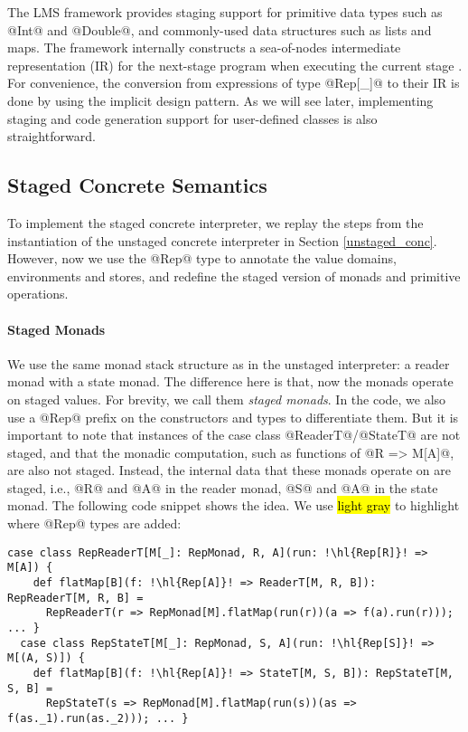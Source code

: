 The LMS framework provides staging support for primitive data types such as
@Int@ and @Double@, and commonly-used data structures such as lists and maps.
The framework internally constructs a sea-of-nodes intermediate representation (IR)
for the next-stage program when executing the current stage \cite{DBLP:conf/birthday/Rompf16}.
For convenience, the conversion from expressions of type @Rep[_]@ to their IR
is done by using the implicit design pattern. As we will see later,
implementing staging and code generation support for user-defined classes is
also straightforward.

\subsection{Staged Concrete Semantics}

To implement the staged concrete interpreter, we replay the steps from the
instantiation of the unstaged concrete interpreter in Section \ref{unstaged_conc}.
However, now we use the @Rep@ type to annotate the value domains, environments and
stores, and redefine the staged version of monads and primitive operations.

\paragraph{Staged Monads}
We use the same monad stack structure as in the unstaged interpreter: a reader
monad with a state monad. The difference here is that, now the monads operate on
staged values.  For brevity, we call them \textit{staged monads}. In the code,
we also use a @Rep@ prefix on the constructors and types to differentiate them.
But it is important to note that instances of the case class @ReaderT@/@StateT@
are not staged, and that the monadic computation, such as functions of @R => M[A]@,
are also not staged. Instead, the internal data that these monads operate on are
staged, i.e., @R@ and @A@ in the reader monad, @S@ and @A@ in the state monad.
The following code snippet shows the idea. We use \hl{light gray} to highlight
where @Rep@ types are added:
\begin{lstlisting}[escapechar=!]
  case class RepReaderT[M[_]: RepMonad, R, A](run: !\hl{Rep[R]}! => M[A]) {
    def flatMap[B](f: !\hl{Rep[A]}! => ReaderT[M, R, B]): RepReaderT[M, R, B] =
      RepReaderT(r => RepMonad[M].flatMap(run(r))(a => f(a).run(r))); ... }
  case class RepStateT[M[_]: RepMonad, S, A](run: !\hl{Rep[S]}! => M[(A, S)]) {
    def flatMap[B](f: !\hl{Rep[A]}! => StateT[M, S, B]): RepStateT[M, S, B] =
      RepStateT(s => RepMonad[M].flatMap(run(s))(as => f(as._1).run(as._2))); ... }
\end{lstlisting}

